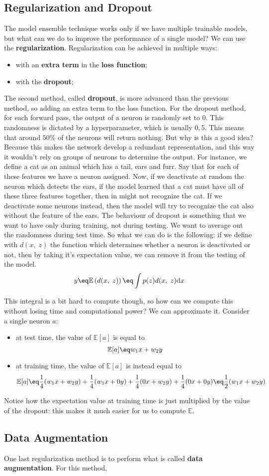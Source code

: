 \subsection{Regularization and Dropout}

The model ensemble technique works only if we have multiple trainable models, but what can we do to improve the performance of a single model? We can use the \textbf{regularization}. Regularization can be achieved in multiple ways:
\begin{itemize}
    \item with an \textbf{extra term} in the \textbf{loss function};
    \item with the \textbf{dropout};
\end{itemize}


The second method, called \textbf{dropout}, is more advanced than the previous method, so adding an extra term to the loss function. For the dropout method, for each forward pass, the output of a neuron is randomly set to 0. This randomness is dictated by a hyperparameter, which is usually $0,5$. This means that around $50\%$ of the neurons will return nothing.
\nl
But why is this a good idea? Because this makes the network develop a redundant representation, and this way it wouldn't rely on groups of neurons to determine the output. For instance, we define a cat as an animal which has a tail, ears and furr. Say that for each of these features we have a neuron assigned. Now, if we deactivate at random the neuron which detects the ears, if the model learned that a cat must have all of these three features together, then in might not recognize the cat. If we deactivate some neurons instead, then the model will try to recognize the cat also without the feature of the ears.
\nl
The behaviour of dropout is something that we want to have only during training, not during testing. We want to average out the randomness during test time. So what we can do is the following: if we define with $d(x, \; z)$ the function which determines whether a neuron is deactivated or not, then by taking it's expectation value, we can remove it from the testing of the model.
\[ y \eq \mathbb{E}\left(d(x, \; z)\right) \eq \int p(z) d(x, \; z) \text{d}x \]

This integral is a bit hard to compute though, so how can we compute this without losing time and computational power? We can approximate it. Consider a single neuron $a$:
\begin{itemize}
    \item at test time, the value of $\mathbb{E}[a]$ is equal to
    \[ \mathbb{E}[a] \eq w_1x + w_2y \]
    \item at training time, the value of $\mathbb{E}[a]$ is instead equal to
    \[ \mathbb{E}[a] \eq \frac{1}{4} (w_1x + w_2y) + \frac{1}{4} (w_1x + 0y) + \frac{1}{4} (0x + w_2y) + \frac{1}{4} (0x + 0y) \eq \frac{1}{2} (w_1x + w_2y) \]
\end{itemize}

Notice how the expectation value at training time is just multiplied by the value of the dropout: this makes it much easier for us to compute $\mathbb{E}$.

\subsection{Data Augmentation}

One last regularization method is to perform what is called \textbf{data augmentation}. For this method, 